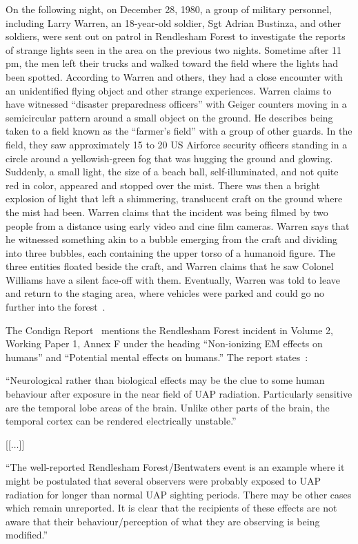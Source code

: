 On the following night, on December 28, 1980, a group of military personnel, including Larry Warren,
an 18-year-old soldier, Sgt Adrian Bustinza, and other soldiers, were sent out on patrol in Rendlesham Forest
to investigate the reports of strange lights seen in the area on the previous two nights.
Sometime after 11 pm, the men left their trucks and walked toward the field where the lights had been spotted.
 According to Warren and others, they had a close encounter with an unidentified flying object and other
strange experiences. Warren claims to have witnessed ``disaster preparedness officers''
with Geiger counters moving in a semicircular pattern around a small object on the ground.
He describes being taken to a field known as the ``farmer's field'' with a group of other guards.
In the field, they saw approximately 15 to 20 US Airforce security officers standing in a circle around a yellowish-green fog that
was hugging the ground and glowing. Suddenly, a small light, the size of a beach ball, self-illuminated, and not quite red in color,
appeared and stopped over the mist. There was then a bright explosion of light that left a shimmering,
translucent craft on the ground where the mist had been.
Warren claims that the incident was being filmed by two people from a distance using early video and cine film cameras.
Warren says that he witnessed something akin to a bubble emerging from the craft and dividing into three bubbles, each containing the upper torso of a humanoid figure.
The three entities floated beside the craft, and Warren claims that he saw Colonel Williams have a silent face-off with them.
 Eventually, Warren was told to leave and return to the staging area,
where vehicles were parked and could go no further into the forest~\cite{Heseltine2023Feb,FleischerHeseltine2023April}.






The Condign Report~\cite{Clarke2022Nov} mentions the Rendlesham Forest incident
in Volume 2, Working Paper 1, Annex F under the heading
``Non-ionizing EM effects on humans'' and ``Potential mental effects on humans.'' The report states~\cite{CondignReportVol2}:
\begin{svgraybox}
``Neurological rather than biological
effects may be the clue to some human
behaviour after exposure  in the near field of
UAP radiation.  Particularly sensitive are the
temporal lobe areas of the brain. Unlike other
parts of the brain, the temporal cortex can be
rendered electrically unstable.''

[[$\ldots$]]

``The well-reported Rendlesham
Forest/Bentwaters event is an example where it
might be postulated that several observers were
probably exposed to UAP radiation for longer
than normal UAP sighting periods. There may
be other cases which remain unreported. It is
clear that the recipients of these effects are not
aware that their behaviour/perception of what
they are observing is being modified.''
\end{svgraybox}


